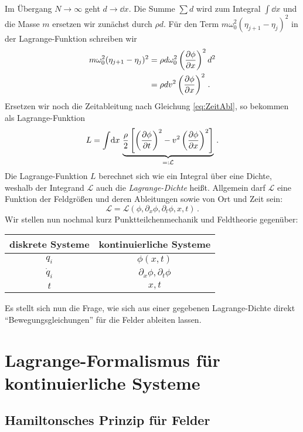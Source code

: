 \documentclass[paper=a4, fontsize=11.0pt, abstractoff, DIV12]{scrartcl}
\newcommand{\LD}{\ensuremath{\mathcal{L}}}
\begin{document}
Im Übergang $N\to\infty$ geht $d\to \dd x$. Die Summe $\sum d$ wird zum
Integral $\int\!\dd x$ und die Masse $m$ ersetzen wir zunächst durch $\rho d$.
Für den Term $m\omega_0^2 (\eta_{j+1}-\eta_j)^2$ in der Lagrange-Funktion
schreiben wir
\begin{align}
m\omega_0^2 (\eta_{j+1}-\eta_j)^2 &= \rho d \omega_0^2\left(\frac{\partial \phi}{\partial x}\right)^2d^2\nonumber\\
&= \rho d v^2 \left(\frac{\partial \phi}{\partial x}\right)^2\,.
\end{align}
Ersetzen wir noch die Zeitableitung nach Gleichung \eqref{eq:ZeitAbl}, so
bekommen als Lagrange-Funktion
\begin{equation}
L = \int\!\dd x\,\underbrace{\frac{\rho}{2}\left[\left(\firstpderiv{\phi}{t}\right)^2 - v^2\left(\firstpderiv{\phi}{x}\right)^2 \right]}_{=:\LD}\,.
\label{eq:LDKette}
\end{equation}
Die Lagrange-Funktion $L$ berechnet sich wie ein Integral über eine Dichte,
weshalb der Integrand $\LD$ auch die \emph{Lagrange-Dichte} heißt. Allgemein
darf $\LD$ eine Funktion der Feldgrößen und deren Ableitungen sowie von Ort
und Zeit sein:
\begin{equation}
\LD = \LD(\phi, \partial_x \phi, \partial_t \phi, x, t)\,.
\end{equation}
Wir stellen nun nochmal kurz Punktteilchenmechanik und Feldtheorie gegenüber:
\begin{center}
\begin{tabular}{c c}
diskrete Systeme & kontinuierliche Systeme\\
\toprule
$q_i$ & $\phi(x,t)$\\
$\dot q_i$ & $\partial_x\phi, \partial_t\phi$\\
$t$ & $x, t$\\
\bottomrule
\end{tabular}
\end{center}
Es stellt sich nun die Frage, wie sich aus einer gegebenen Lagrange-Dichte
direkt ``Bewegungsgleichungen'' für die Felder ableiten lassen.

\section{Lagrange-Formalismus für kontinuierliche Systeme}

\subsection{Hamiltonsches Prinzip für Felder}
\end{document}
